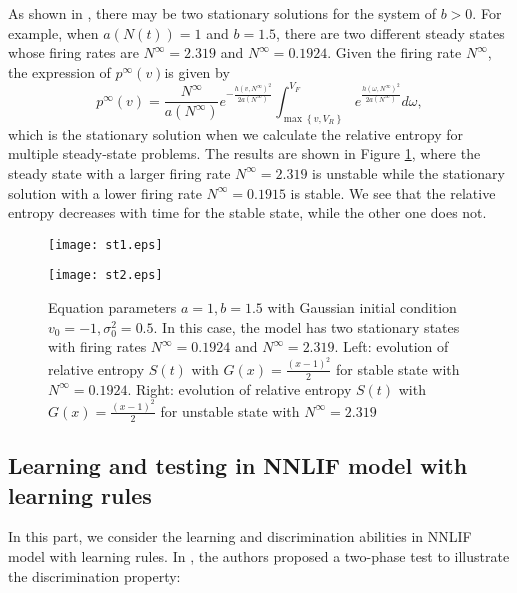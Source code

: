 As shown in \cite{caceres2011analysis}, there may be two stationary solutions for the system of $b>0$. For example, when $ a(N(t)) = 1$ and $b =1.5$, there are two different steady states whose firing rates are $N^{\infty}=2.319$ and $N^{\infty}=0.1924$. Given the firing rate $N^{\infty}$, the expression of $p^{\infty}(v)$is given by
\begin{equation}
    p^{\infty}(v)=\frac{N^{\infty}}{a\left(N^{\infty}\right)} e^{-\frac{h\left(v, N^{\infty}\right)^{2}}{2 a\left(N^{\infty}\right)}} \int_{\max \left\{v, V_{R}\right\}}^{V_{F}} e^{\frac{h\left(\omega, N^{\infty}\right)^{2}}{2 a\left(N^{\infty}\right)}} d \omega ,
\end{equation}
which is the stationary solution when we calculate the relative entropy for multiple steady-state problems. The results are shown in Figure \ref{fig:relative_entropy4}, where the steady state with a larger firing rate $N^{\infty}=2.319$ is unstable while the stationary solution with a lower firing rate $N^{\infty}=0.1915$ is stable. We see that the relative entropy decreases with time for the stable state, while the other one does not.
\begin{figure}[!htb]
    \centering
    \begin{minipage}[c]{0.49\textwidth}
        \centering
        \texttt{[image: st1.eps]}
    \end{minipage}
    \begin{minipage}[c]{0.49\textwidth}
        \centering
        \texttt{[image: st2.eps]}
    \end{minipage}
    \caption{Equation parameters $a=1,b=1.5$  with Gaussian initial condition $v_0=-1, \sigma_0^2=0.5$. In this case, the model has two stationary states with firing rates $N^{\infty}=0.1924$ and $N^{\infty}=2.319$. Left: evolution of relative entropy $S(t)$ with $G(x)=\frac{(x-1)^2}{2}$ for stable state with $N^{\infty}=0.1924$. Right: evolution of relative entropy $S(t)$ with $G(x)=\frac{(x-1)^2}{2}$ for unstable state with $N^{\infty}=2.319$ }
     \label{fig:relative_entropy4}
\end{figure}



\subsection{Learning and testing in NNLIF model with learning rules}\label{sec:Learning_testing}
In this part, we consider the learning and discrimination abilities in NNLIF model with learning rules. In \cite{perthame2017distributed}, the authors proposed a two-phase test to illustrate the discrimination property:\medskip


